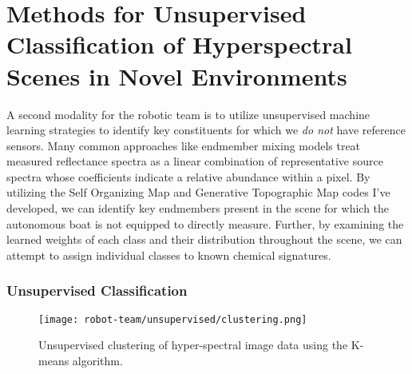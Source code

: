 \section{Methods for Unsupervised Classification of Hyperspectral Scenes in Novel Environments}

A second modality for the robotic team is to utilize unsupervised machine learning strategies to identify key constituents for which we \textit{do not} have reference sensors. Many common approaches like endmember mixing models treat measured reflectance spectra as a linear combination of representative source spectra whose coefficients indicate a relative abundance within a pixel. By utilizing the Self Organizing Map and Generative Topographic Map codes I've developed, we can identify key endmembers present in the scene for which the autonomous boat is not equipped to directly measure. Further, by examining the learned weights of each class and their distribution throughout the scene, we can attempt to assign individual classes to known chemical signatures.

\subsubsection{Unsupervised Classification}
\begin{figure}[h]
  \texttt{[image: robot-team/unsupervised/clustering.png]}
  \caption{Unsupervised clustering of hyper-spectral image data using the K-means algorithm.\label{clustering}}
\end{figure}



